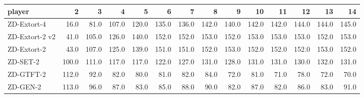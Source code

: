 \begin{tabular}{lrrrrrrrrrrrrr}
\toprule
         player &      2 &      3 &      4 &      5 &      6 &      7 &      8 &      9 &     10 &     11 &     12 &     13 &     14 \\
\midrule
    ZD-Extort-4 &   16.0 &   81.0 &  107.0 &  120.0 &  135.0 &  136.0 &  142.0 &  140.0 &  142.0 &  142.0 &  144.0 &  144.0 &  145.0 \\
 ZD-Extort-2 v2 &   41.0 &  105.0 &  126.0 &  140.0 &  152.0 &  152.0 &  153.0 &  152.0 &  153.0 &  153.0 &  153.0 &  152.0 &  153.0 \\
    ZD-Extort-2 &   43.0 &  107.0 &  125.0 &  139.0 &  151.0 &  151.0 &  152.0 &  153.0 &  152.0 &  152.0 &  152.0 &  153.0 &  152.0 \\
       ZD-SET-2 &  100.0 &  111.0 &  117.0 &  117.0 &  122.0 &  127.0 &  131.0 &  128.0 &  131.0 &  131.0 &  130.0 &  132.0 &  131.0 \\
      ZD-GTFT-2 &  112.0 &   92.0 &   82.0 &   80.0 &   81.0 &   82.0 &   84.0 &   72.0 &   81.0 &   71.0 &   78.0 &   72.0 &   70.0 \\
       ZD-GEN-2 &  113.0 &   96.0 &   87.0 &   83.0 &   85.0 &   88.0 &   90.0 &   82.0 &   87.0 &   82.0 &   86.0 &   83.0 &   91.0 \\
\bottomrule
\end{tabular}
